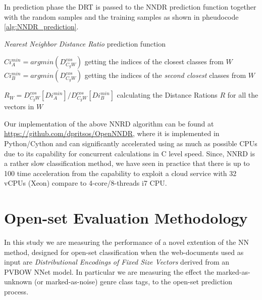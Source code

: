 \documentclass[runningheads]{llncs}
\begin{document}
In prediction phase the DRT is passed to the NNDR prediction function together with the random samples and the training samples as shown in pheudocode \ref{alg:NNDR_prediction}.

\begin{algorithm}[H]
\caption{\textit{Nearest Neighbor Distance Ratio} prediction function}\label{alg:NNDR_prediction}


$Ci^{min}_{A} = argmin(D^{cos}_{C_{g}W})$ getting the indices of the closest classes from $W$\;
$Ci^{min}_{B} = argmin(D^{cos}_{C_{g}W})$ getting the indices of the \textit{second closest} classes from $W$\;

$R_{W} = D^{cos}_{C_{g}W}[Di^{min}_{A}] / D^{cos}_{C_{g}W}[Di^{min}_{B}]$ calculating the Distance Rations $R$ for all the vectors in $W$


\end{algorithm}

Our implementation of the above NNRD algorithm can be found at \url{https://github.com/dpritsos/OpenNNDR}, where it is implemented in Python/Cython and can significantly accelerated using as much as possible CPUs due to its capability for concurrent calculations in C level speed. Since, NNRD is a rather slow classification method, we have seen in practice that there is up to 100 time acceleration from the capability to exploit a cloud service with 32 vCPUs (Xeon) compare to 4-core/8-threads i7 CPU.

\section{Open-set Evaluation Methodology}
In this study we are measuring the performance of a novel extention of the NN method, designed for open-set classification when the web-documents used as input are \textit{Distributional Encodings of Fixed Size Vectors} derived from an PVBOW NNet model. In particular we are measuring the effect the marked-as-unknown (or marked-as-noise) genre class tags, to the open-set prediction process.
\end{document}
